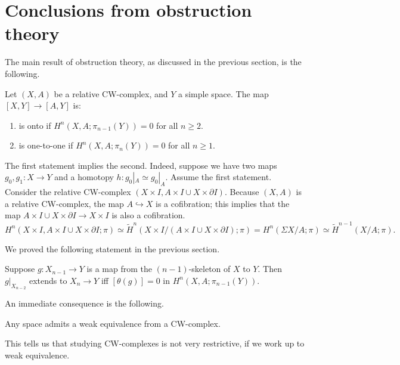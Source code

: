 \section{Conclusions from obstruction theory}
The main result of obstruction theory, as discussed in the previous section, is the following.
\begin{theorem}
    Let $(X,A)$ be a relative CW-complex, and $Y$ a simple space. The map $[X,Y]\to [A,Y]$ is:
    \begin{enumerate}
	\item is onto if $H^n(X,A;\pi_{n-1}(Y)) = 0$ for all $n\geq 2$.
	\item is one-to-one if $H^n(X,A;\pi_n(Y)) = 0$ for all $n\geq 1$.
    \end{enumerate}
\end{theorem}
\begin{remark}
    The first statement implies the second.
    Indeed, suppose we have two maps $g_0,g_1:X\to Y$ and a homotopy $h:g_0|_{A}\simeq g_0|_{A}$.
    Assume the first statement.
    Consider the relative CW-complex $(X\times I,A\times I\cup X\times\partial I)$.
    Because $(X,A)$ is a relative CW-complex, the map $A\hookrightarrow X$ is a cofibration; this implies that the map $A\times I\cup X\times\partial I\to X\times I$ is also a cofibration.
    $$H^n(X\times I,A\times I\cup X\times\partial I;\pi)\simeq \widetilde{H}^n(X\times I/(A\times I\cup X\times\partial I);\pi) = H^n(\Sigma X/A;\pi)\simeq \widetilde{H}^{n-1}(X/A;\pi).$$
\end{remark}
We proved the following statement in the previous section.
\begin{prop}
    Suppose $g:X_{n-1}\to Y$ is a map from the $(n-1)$-skeleton of $X$ to $Y$. Then $g|_{X_{n-2}}$ extends to $X_n\to Y$ iff $[\theta(g)] = 0$ in $H^n(X,A;\pi_{n-1}(Y))$.
\end{prop}
An immediate consequence is the following.
\begin{theorem}[CW-approximation]
    Any space admits a weak equivalence from a CW-complex.
\end{theorem}
This tells us that studying CW-complexes is not very restrictive, if we work up to weak equivalence.

